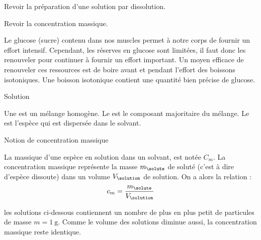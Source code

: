 \tetePremStssChim
{}

\begin{objectifs}
  \item Revoir la préparation d'une solution par dissolution.
  \item Revoir la concentration massique.
\end{objectifs}

\begin{contexte}
  Le glucose (sucre) contenu dans nos muscles permet à notre corps de fournir un effort intensif.
  Cependant, les réserves en glucose sont limitées, il faut donc les renouveler pour continuer à fournir un effort important.
  Un moyen efficace de renouveler ces ressources est de boire avant et pendant l'effort des boissons isotoniques.
  Une boisson isotonique contient une quantité bien précise de glucose.
  
\end{contexte}
\bigskip


\begin{doc}{Solution}
  \begin{importants}
     Une  est un mélange homogène.
     Le  est le composant majoritaire du mélange. Le  est l'espèce qui est dispersée dans le solvant.
  \end{importants}
\end{doc}

\begin{doc}{Notion de concentration massique}
  \begin{importants}
    La  massique d’une espèce en solution dans un solvant, est notée $C_m$.
    La concentration massique représente la masse $m_\solute$ de soluté (c'est à dire d'espèce dissoute) dans un volume $V_\solution$ de solution.
    On a alors la relation :
    \begin{equation*}
      c_m = \dfrac{ m_\solute }{ V_\solution }
    \end{equation*}
  \end{importants}

  \exemples les solutions ci-dessous contiennent un nombre de plus en plus petit de particules de masse $m = \qty{1}{\g}$.
  Comme le volume des solutions diminue aussi, la concentration massique reste identique.

\end{doc}

